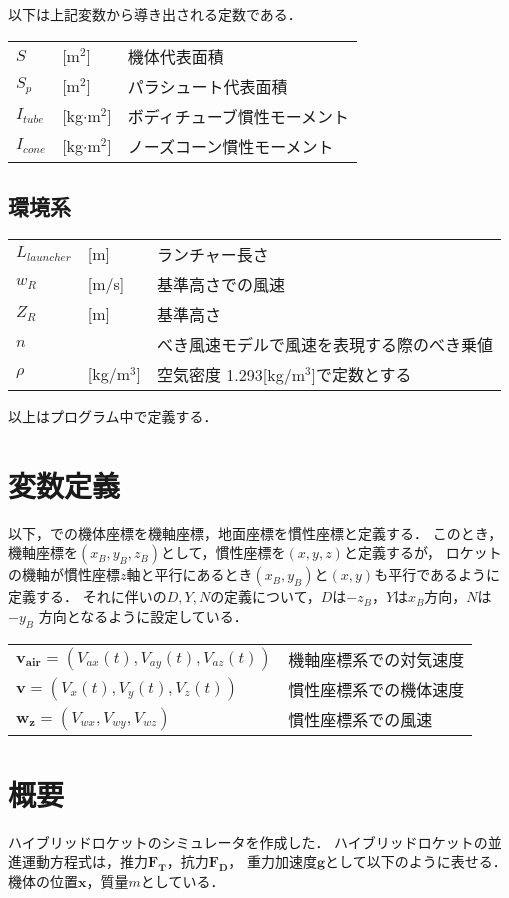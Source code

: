 \documentclass[a4paper]{jsarticle}
\begin{document}
以下は上記変数から導き出される定数である．

\begin{tabular}{lll}
$S$ &[m$^2$]&機体代表面積\\
$S_p$ &[m$^2$]&パラシュート代表面積\\
$I_{tube}$ &[kg$\cdot$m$^2$]&ボディチューブ慣性モーメント\\
$I_{cone}$ &[kg$\cdot$m$^2$]&ノーズコーン慣性モーメント\\
\end{tabular}

\subsection{環境系}
\begin{tabular}{lll}
$L_{launcher}$ &[m]&ランチャー長さ\\
$w_R$ &[m/s]&基準高さでの風速\\
$Z_R$ &[m]&基準高さ\\
$n$ &&べき風速モデルで風速を表現する際のべき乗値\\
$\rho$ &[kg/m$^3$] & 空気密度 1.293[kg/m$^3$]で定数とする\\
\end{tabular}

以上はプログラム中で定義する．

\section{変数定義}
以下，\cite{bib1}での機体座標を機軸座標，地面座標を慣性座標と定義する．
このとき，機軸座標を$(x_B, y_B, z_B)$として，慣性座標を$(x, y, z)$と定義するが，
ロケットの機軸が慣性座標$z$軸と平行にあるとき$(x_B, y_B)$と$(x, y)$も平行であるように定義する．
それに伴い\cite{bib1}の$D, Y, N$の定義について，$D$は$-z_B$，$Y$は$x_B$方向，$N$は$-y_B$
方向となるように設定している．

\begin{tabular}{ll}
$\bm{v_{air}} = (V_{ax}(t), V_{ay}(t), V_{az}(t))$ &機軸座標系での対気速度\\
$\bm{v}　= (V_{x}(t), V_{y}(t), V_{z}(t))$ &慣性座標系での機体速度\\
$\bm{w_z} = (V_{wx},  V_{wy}, V_{wz})$ &慣性座標系での風速\\
\end{tabular}


\section{概要}
ハイブリッドロケットのシミュレータを作成した．
ハイブリッドロケットの並進運動方程式は，推力$\bm{F_T}$，抗力$\bm{F_D}$，
重力加速度$\bm{g}$として以下のように表せる．機体の位置$\bm{x}$，質量$m$としている．
\end{document}
